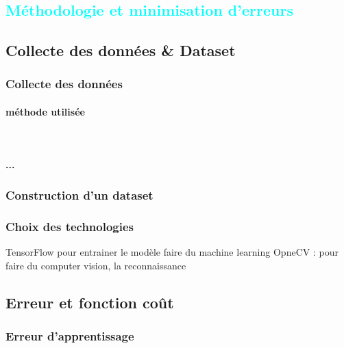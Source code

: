 			


%
%



\textcolor{cyan}{\chapter{Méthodologie et minimisation d'erreurs}}	
	\section{Collecte des données \& Dataset }
	
	\subsection*{Collecte des données}
	\lipsum[1]
	\lipsum[2]
	\subsubsection{méthode utilisée}
	\lipsum[1]\\
	
	\subsubsection{...}
	\lipsum[1]
	\subsection*{Construction d'un dataset}
	\lipsum[1]
	\subsection*{Choix des technologies}
	\lipsum[1]
	TensorFlow pour entrainer le modèle faire du machine learning
	OpneCV : pour faire du computer vision, la reconnaissance 

	\section{Erreur et fonction coût}
	\lipsum[1]
	\subsection{Erreur d'apprentissage}
	\lipsum[1]
	
